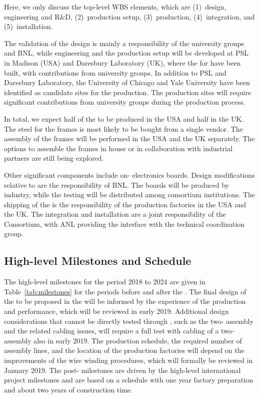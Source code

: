 Here, we only discuss the top-level WBS elements, which are (1)~design, engineering and R\&D, (2)~production setup, (3)~production, (4)~integration, and (5)~installation.

The validation of the design is mainly a responsibility of the university groups and BNL, while engineering and the production setup will be developed at PSL in Madison (USA) and Daresbury Laboratory (UK), where the  for  have been built, with contributions from university groups. In addition to PSL and Daresbury Laboratory, the University of Chicago and Yale University have been identified as candidate sites for the production. The production sites will require significant contributions from university groups during the production process. 

In total, we expect half of the  to be produced in the USA and half in the UK. The steel for the frames is most likely to be bought from a single vendor. The assembly of the frames will be performed in the USA and the UK separately. The options to assemble the frames in house or in collaboration with industrial partners are still being explored. 

Other significant components include on- electronics boards. Design modifications relative to  are the responsibility of BNL. The boards will be produced by industry, while the testing will be distributed among consortium institutions. The shipping of the  is the responsibility of the production factories in the USA and the UK.  The integration and installation are a joint responsibility of the Consortium, with ANL providing the interface with the technical coordination group.


\subsection{High-level Milestones and Schedule}
\label{sec:fdsp-apa-org-cs}

The high-level milestones for the period 2018 to 2024 are given in Table~\ref{tab:milestones} for the periods before and after the . The final design of the  to be proposed in the  will be informed by the experience of the   production and performance, which will be reviewed in early 2019. Additional design considerations that cannot be directly tested through , such as the two- assembly and the related cabling issues, will require a full test with cabling of a two- assembly also in early 2019. The production schedule, the required number of assembly lines, and the location of the production factories will depend on the improvements of the wire winding procedures, which will formally be reviewed in January 2019. The post- milestones are driven by the high-level international project milestones and are based on a schedule with one year factory preparation and about two years of  construction time.

